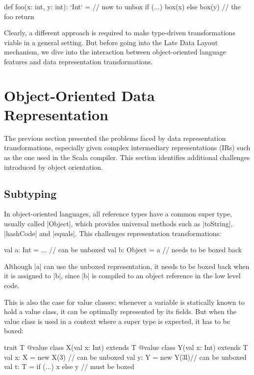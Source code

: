 \begin{lstlisting-nobreak}
 def foo(x: int, y: int): `Int` = // now to unbox
   if (...) box(x) else box(y) // the foo return
\end{lstlisting-nobreak}

Clearly, a different approach is required to make type-driven transformations viable in a general setting. But before going into the Late Data Layout mechanism, we dive into the interaction between object-oriented language features and data representation transformations.

\section{Object-Oriented Data Representation}
\label{sec:problem-oo}

The previous section presented the problems faced by data representation transformations, especially given complex intermediary representations (IRs) such as the one used in the Scala compiler. This section identifies additional challenges introduced by object orientation.

\subsection{Subtyping}

\label{sec:problem-oo/subtyping}
In object-oriented languages, all reference types have a common super type, usually called |Object|, which provides universal methods such as |toString|, |hashCode| and |equals|. This challenges representation transformations:

\begin{lstlisting-nobreak}
 val a: Int = ...        // can be unboxed
 val b: Object = a // needs to be boxed back
\end{lstlisting-nobreak}

Although |a| can use the unboxed representation, it needs to be boxed back when it is assigned to |b|, since |b| is compiled to an object reference in the low level code.

This is also the case for value classes: whenever a variable is statically known to hold a value class, it can be optimally represented by its fields. But when the value class is used in a context where a super type is expected, it has to be boxed:

\begin{lstlisting-nobreak}
 trait T
 @value class X(val x: Int) extends T
 @value class Y(val x: Int) extends T
 val x: X = new X(3)  // can be unboxed
 val y: Y = new Y(3l)// can be unboxed
 val t: T = if (...) x else y // must be boxed
\end{lstlisting-nobreak}


